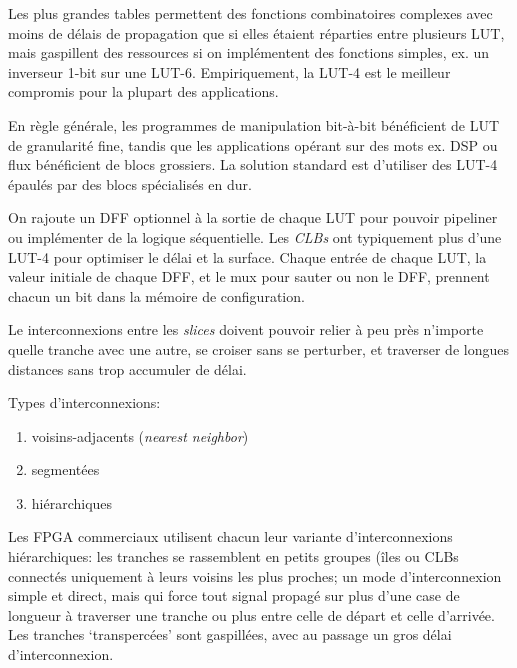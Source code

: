 Les plus grandes tables permettent des fonctions combinatoires complexes avec moins de délais de propagation que si elles étaient réparties entre plusieurs LUT, mais gaspillent des ressources si on implémentent des fonctions simples, ex. un inverseur 1-bit sur une LUT-6. Empiriquement, la LUT-4 est le meilleur compromis pour la plupart des applications.

En règle générale, les programmes de manipulation bit-à-bit bénéficient de LUT de granularité fine, tandis que les applications opérant sur des mots ex. DSP ou flux bénéficient de blocs grossiers. La solution standard est d'utiliser des LUT-4 épaulés par des blocs spécialisés en dur.

On rajoute un DFF optionnel à la sortie de chaque LUT pour pouvoir pipeliner ou implémenter de la logique séquentielle. Les \emph{CLBs} ont typiquement plus d'une LUT-4 pour optimiser le délai et la surface. Chaque entrée de chaque LUT, la valeur initiale de chaque DFF, et le mux pour sauter ou non le DFF, prennent chacun un bit dans la mémoire de configuration.


Le interconnexions entre les \emph{slices} doivent pouvoir relier à peu près n'importe quelle tranche avec une autre, se croiser sans se perturber, et traverser de longues distances sans trop accumuler de délai.

Types d'interconnexions:

\begin{enumerate}
	\item{voisins-adjacents (\emph{nearest neighbor})}
	\item{segmentées}
	\item{hiérarchiques}
\end{enumerate}

Les FPGA commerciaux utilisent chacun leur variante d'interconnexions hiérarchiques: les tranches se rassemblent en petits groupes (\og îles \fg ou CLBs connectés uniquement à leurs voisins les plus proches; un mode d'interconnexion simple et direct, mais qui force tout signal propagé sur plus d'une case de longueur à traverser une tranche ou plus entre celle de départ et celle d'arrivée. Les tranches `transpercées' sont gaspillées, avec au passage un gros délai d'interconnexion.

